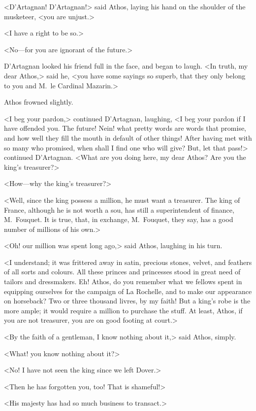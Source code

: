 <D'Artagnan! D'Artagnan!> said Athos, laying his hand on the shoulder of the musketeer, <you are unjust.>

<I have a right to be so.>

<No—for you are ignorant of the future.>

D'Artagnan looked his friend full in the face, and began to laugh. <In truth, my dear Athos,> said he, <you have some sayings so superb, that they only belong to you and M.~le Cardinal Mazarin.>

Athos frowned slightly.

<I beg your pardon,> continued D'Artagnan, laughing, <I beg your pardon if I have offended you. The future! Nein! what pretty words are words that promise, and how well they fill the mouth in default of other things!  After having met with so many who promised, when shall I find one who will give? But, let that pass!> continued D'Artagnan. <What are you doing here, my dear Athos? Are you the king's treasurer?>

<How—why the king's treasurer?>

<Well, since the king possess a million, he must want a treasurer. The king of France, although he is not worth a sou, has still a superintendent of finance, M.~Fouquet. It is true, that, in exchange, M.~Fouquet, they say, has a good number of millions of his own.>

<Oh! our million was spent long ago,> said Athos, laughing in his turn.

<I understand; it was frittered away in satin, precious stones, velvet, and feathers of all sorts and colours. All these princes and princesses stood in great need of tailors and dressmakers. Eh! Athos, do you remember what we fellows spent in equipping ourselves for the campaign of La Rochelle, and to make our appearance on horseback? Two or three thousand livres, by my faith! But a king's robe is the more ample; it would require a million to purchase the stuff. At least, Athos, if you are not treasurer, you are on good footing at court.>

<By the faith of a gentleman, I know nothing about it,> said Athos, simply.

<What! you know nothing about it?>

<No! I have not seen the king since we left Dover.>

<Then he has forgotten you, too!  That is shameful!>

<His majesty has had so much business to transact.>

